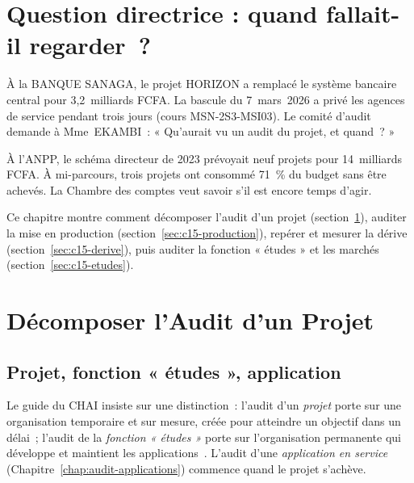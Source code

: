 \bigskip

\section*{Question directrice : quand fallait-il regarder~?}

À la BANQUE SANAGA, le projet HORIZON a remplacé le système bancaire
central pour 3,2~milliards FCFA. La bascule du 7~mars~2026 a privé les
agences de service pendant trois jours (cours MSN-2S3-MSI03). Le comité
d'audit demande à Mme~EKAMBI~: « Qu'aurait vu un audit du projet, et
quand~? »

À l'ANPP, le schéma directeur de 2023 prévoyait neuf projets pour
14~milliards FCFA. À mi-parcours, trois projets ont consommé 71~\% du
budget sans être achevés. La Chambre des comptes veut savoir s'il est
encore temps d'agir.

Ce chapitre montre comment décomposer l'audit d'un projet
(section~\ref{sec:c15-decomposer}), auditer la mise en production
(section~\ref{sec:c15-production}), repérer et mesurer la dérive
(section~\ref{sec:c15-derive}), puis auditer la fonction « études » et les
marchés (section~\ref{sec:c15-etudes}).

\separateur

\section{Décomposer l'Audit d'un Projet}
\label{sec:c15-decomposer}

\subsection{Projet, fonction « études », application}

Le guide du CHAI insiste sur une distinction~: l'audit d'un \emph{projet}
porte sur une organisation temporaire et sur mesure, créée pour atteindre
un objectif dans un délai~; l'audit de la \emph{fonction « études »} porte
sur l'organisation permanente qui développe et maintient les
applications~\cite{chai2014guide}. L'audit d'une \emph{application en
service} (Chapitre~\ref{chap:audit-applications}) commence quand le projet
s'achève.

